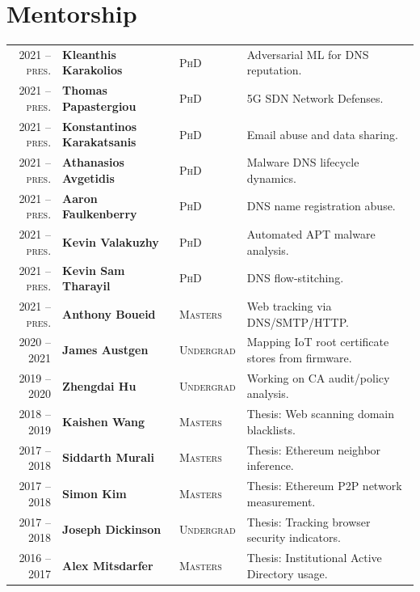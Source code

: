 \documentclass[10pt,singlecolumn]{article} %
\begin{document}
\section{Mentorship} 
\begin{tabular}{rlll}
2021 -- \textsc{pres.} & \textbf{Kleanthis Karakolios} & \textsc{PhD} & Adversarial ML for DNS reputation.\\ 
2021 -- \textsc{pres.} & \textbf{Thomas Papastergiou} & \textsc{PhD} & 5G SDN Network Defenses.\\ 
2021 -- \textsc{pres.} & \textbf{Konstantinos Karakatsanis} & \textsc{PhD} & Email abuse and data sharing.\\ 
2021 -- \textsc{pres.} & \textbf{Athanasios Avgetidis} & \textsc{PhD} & Malware DNS lifecycle dynamics.\\ 
2021 -- \textsc{pres.} & \textbf{Aaron Faulkenberry} & \textsc{PhD} & DNS name registration abuse.\\ 
2021 -- \textsc{pres.} & \textbf{Kevin Valakuzhy} & \textsc{PhD} & Automated APT malware analysis.\\ 
2021 -- \textsc{pres.} & \textbf{Kevin Sam Tharayil} & \textsc{PhD} & DNS flow-stitching.\\ 
2021 -- \textsc{pres.} & \textbf{Anthony Boueid} & \textsc{Masters} & Web tracking via DNS/SMTP/HTTP.\\ 
2020 -- 2021             & \textbf{James Austgen} & \textsc{Undergrad} & Mapping IoT root certificate stores from firmware.\\ 
2019 -- 2020	         & \textbf{Zhengdai Hu} & \textsc{Undergrad} & Working on CA audit/policy analysis.\\ 
2018 -- 2019	         & \textbf{Kaishen Wang} & \textsc{Masters} & Thesis: Web scanning domain blacklists.\\
2017 -- 2018	         & \textbf{Siddarth Murali} & \textsc{Masters} & Thesis: Ethereum neighbor inference.\\ 
2017 -- 2018	         & \textbf{Simon Kim} & \textsc{Masters} & Thesis: Ethereum P2P network measurement.\\  
2017 -- 2018	         & \textbf{Joseph Dickinson} & \textsc{Undergrad} & Thesis: Tracking browser security indicators.\\  
2016 -- 2017	         & \textbf{Alex Mitsdarfer} & \textsc{Masters} & Thesis: Institutional Active Directory usage.\\ 
\end{tabular}\\[10pt]
\end{document}
